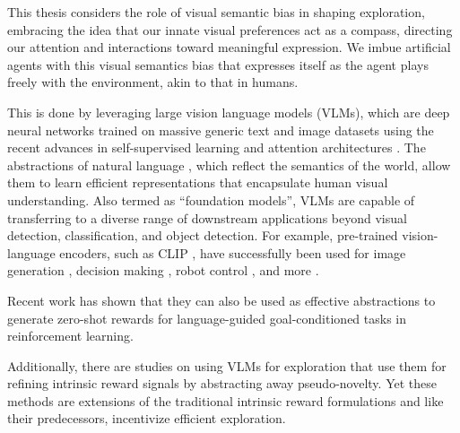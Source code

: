 This thesis considers the role of visual semantic bias in shaping exploration, embracing the idea that our innate visual preferences act as a compass, directing our attention and interactions toward meaningful expression.
We imbue artificial agents with this visual semantics bias that expresses itself as the agent plays freely with the environment, akin to that in humans.

This is done by leveraging large vision language models (VLMs), which are deep neural networks trained on massive generic text and image datasets using the recent advances in self-supervised learning \citep{ssl} and attention architectures \citep{vit}. 
The abstractions of natural language \citep{languageforlearning,vlmhumans}, which reflect the semantics of the world, allow them to learn efficient representations that encapsulate human visual understanding.
% 
Also termed as ``foundation models'', VLMs are capable of transferring to a diverse range of downstream applications beyond visual detection, classification, and object detection.
For example, pre-trained vision-language encoders, such as CLIP \citep{clip}, have successfully been used for image generation \citep{imagegeneration}, decision making \citep{decision_making_clip}, robot control \citep{cliport,embodied}, and more \citep{vlmsurvey}.
% 

Recent work \citep{zest,negprompt,vlmrm,lamp} has shown that they can also be used as effective abstractions to generate zero-shot rewards for language-guided goal-conditioned tasks in reinforcement learning.

Additionally, there are studies on using VLMs for exploration \citep{vlmlang,vlmdistill} that use them for refining intrinsic reward signals by abstracting away pseudo-novelty.
Yet these methods are extensions of the traditional intrinsic reward formulations and like their predecessors, incentivize efficient exploration.

